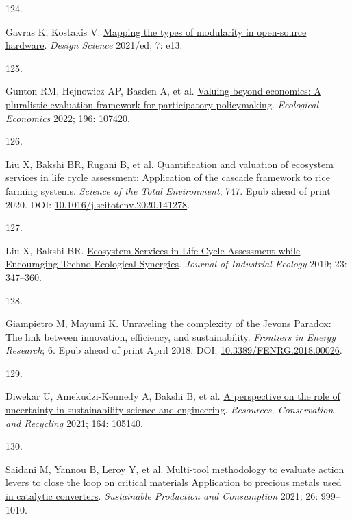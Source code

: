 \documentclass[
  12pt,
  a4paperpaper,
  onecolumn]{article}
\newlength{\cslhangindent}
\newlength{\csllabelwidth}
\newlength{\cslentryspacingunit} %
\newenvironment{CSLReferences}[2] %
 {%
  \setlength{\parindent}{0pt}
  \ifodd #1
  \let\oldpar\par
  \def\par{\hangindent=\cslhangindent\oldpar}
  \fi
  \setlength{\parskip}{#2\cslentryspacingunit}
 }%
 {}
\newcommand{\CSLLeftMargin}[1]{\parbox[t]{\csllabelwidth}{#1}}
\newcommand{\CSLRightInline}[1]{\parbox[t]{\linewidth - \csllabelwidth}{#1}\break}
\begin{document}
\begin{CSLReferences}{0}{0}
\leavevmode{}%
\CSLLeftMargin{124. }%
\CSLRightInline{Gavras K, Kostakis V.
\href{https://doi.org/10.1017/dsj.2021.11}{Mapping the types of
modularity in open-source hardware}. \emph{Design Science} 2021/ed; 7:
e13.}

\leavevmode{}%
\CSLLeftMargin{125. }%
\CSLRightInline{Gunton RM, Hejnowicz AP, Basden A, et al.
\href{https://doi.org/10.1016/j.ecolecon.2022.107420}{Valuing beyond
economics: {A} pluralistic evaluation framework for participatory
policymaking}. \emph{Ecological Economics} 2022; 196: 107420.}

\leavevmode{}%
\CSLLeftMargin{126. }%
\CSLRightInline{Liu X, Bakshi BR, Rugani B, et al. Quantification and
valuation of ecosystem services in life cycle assessment: {Application}
of the cascade framework to rice farming systems. \emph{Science of the
Total Environment}; 747. Epub ahead of print 2020. DOI:
\href{https://doi.org/10.1016/j.scitotenv.2020.141278}{10.1016/j.scitotenv.2020.141278}.}

\leavevmode{}%
\CSLLeftMargin{127. }%
\CSLRightInline{Liu X, Bakshi BR.
\href{https://doi.org/10.1111/jiec.12755}{Ecosystem {Services} in {Life
Cycle Assessment} while {Encouraging Techno}-{Ecological Synergies}}.
\emph{Journal of Industrial Ecology} 2019; 23: 347--360.}

\leavevmode{}%
\CSLLeftMargin{128. }%
\CSLRightInline{Giampietro M, Mayumi K. Unraveling the complexity of the
{Jevons Paradox}: {The} link between innovation, efficiency, and
sustainability. \emph{Frontiers in Energy Research}; 6. Epub ahead of
print April 2018. DOI:
\href{https://doi.org/10.3389/FENRG.2018.00026}{10.3389/FENRG.2018.00026}.}

\leavevmode{}%
\CSLLeftMargin{129. }%
\CSLRightInline{Diwekar U, Amekudzi-Kennedy A, Bakshi B, et al.
\href{https://doi.org/10.1016/j.resconrec.2020.105140}{A perspective on
the role of uncertainty in sustainability science and engineering}.
\emph{Resources, Conservation and Recycling} 2021; 164: 105140.}

\leavevmode{}%
\CSLLeftMargin{130. }%
\CSLRightInline{Saidani M, Yannou B, Leroy Y, et al.
\href{https://doi.org/10.1016/j.spc.2021.01.010}{Multi-tool methodology
to evaluate action levers to close the loop on critical materials
\textendash{} {Application} to precious metals used in catalytic
converters}. \emph{Sustainable Production and Consumption} 2021; 26:
999--1010.}


\end{CSLReferences}
\end{document}
